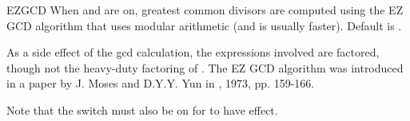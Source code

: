 \begin{Switch}[ezgcd]{EZGCD}
When  and  are on, greatest common divisors are
computed using the EZ GCD algorithm that uses modular arithmetic (and is
usually faster).  Default is .

\begin{Comments}
As a side effect of the gcd calculation, the expressions involved are
factored, though not the heavy-duty factoring of . The
EZ GCD algorithm was introduced in a paper by J. Moses and D.Y.Y. Yun in
, 1973, pp. 159-166.

Note that the  switch must also be on for  to have
effect.
\end{Comments}
\end{Switch}


